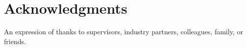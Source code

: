 \chapter*{Acknowledgments}

An expression of thanks to supervisors, industry partners, colleagues, family, or friends.